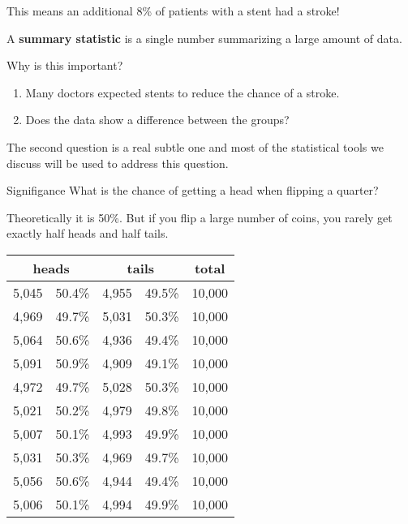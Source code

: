 \documentclass{beamer}
\begin{document}
\begin{frame}
\begin{note}
This means an additional 8\% of patients with a stent had a stroke!
\end{note}\pause

\begin{definition}
A \textbf{summary statistic} is a single number summarizing a large amount of data.
\end{definition}\pause

\begin{block}{Why is this important?}
\begin{enumerate}
\item Many doctors expected stents to reduce the chance of a stroke.\pause
\item Does the data show a  difference between the groups?
\end{enumerate}
\end{block}\pause

\begin{note}
The second question is a real subtle one and most of the statistical tools we discuss will be used to address this question.
\end{note}
\end{frame}

\begin{frame}
\begin{block}{Signifigance}
What is the chance of getting a head when flipping a quarter?\pause 

\vspace{2mm}
Theoretically it is 50\%. But if you flip a large number of coins, you rarely get exactly half heads and half tails.

\begin{center}
\begin{tabular}{ccccc}\hline
\multicolumn{2}{c}{heads} & \multicolumn{2}{c}{tails} & total \\\hline
5,045 & 50.4\% & 4,955 & 49.5\% & 10,000\\
4,969 & 49.7\% & 5,031 & 50.3\% & 10,000\\
5,064 & 50.6\% & 4,936 & 49.4\% & 10,000\\
5,091 & 50.9\% & 4,909 & 49.1\% & 10,000\\
4,972 & 49.7\% & 5,028 & 50.3\% & 10,000\\
5,021 & 50.2\% & 4,979 & 49.8\% & 10,000\\
5,007 & 50.1\% & 4,993 & 49.9\% & 10,000\\
5,031 & 50.3\% & 4,969 & 49.7\% & 10,000\\
5,056 & 50.6\% & 4,944 & 49.4\% & 10,000\\
5,006 & 50.1\% & 4,994 & 49.9\% & 10,000\\
\end{tabular}
\end{center}
\end{block}
\end{frame}
\end{document}
